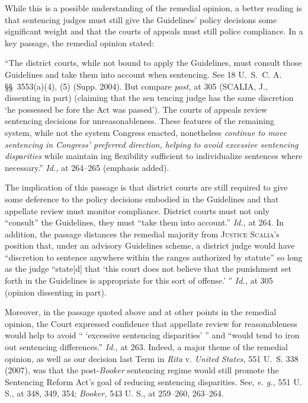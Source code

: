   While this is a possible understanding of the remedial opinion,
a better reading is that sentencing judges must still give the
Guidelines' policy decisions some significant weight and that the
courts of appeals must still police compliance. In a key passage, the
remedial opinion stated:

    ``The district courts, while not bound to apply the Guidelines,
    must consult those Guidelines and take them into account when
    sentencing. See 18 U.~S.~C. A. \S\S~3553(a)(4), (5) (Supp.
    2004). But compare \emph{post,} at 305 (SCALIA, J., dissenting in
    part) (claiming that the sen tencing judge has the same discretion
    ‘he possessed be fore the Act was passed'). The courts of
    appeals review sentencing decisions for unreasonableness. These
    fea\newpage tures of the remaining system, while not the system
    Congress enacted, nonetheless \emph{continue to move sentencing in
    Congress' preferred direction, helping to avoid excessive
    sentencing disparities} while maintain ing flexibility sufficient
    to individualize sentences where necessary.'' \emph{Id.,} at
    264--265 (emphasis added).

  The implication of this passage is that district courts are still
required to give some deference to the policy decisions embodied in the
Guidelines and that appellate review must monitor compliance. District
courts must not only ``consult'' the Guidelines, they must ``take
them into account.'' \emph{Id.,} at 264. In addition, the passage
distances the remedial majority from \textsc{Justice Scalia}'s position
that, under an advisory Guidelines scheme, a district judge would have
``discretion to sentence anywhere within the ranges authorized by
statute'' so long as the judge ``state[d] that ‘this court does not
believe that the punishment set forth in the Guidelines is appropriate
for this sort of offense.' '' \emph{Id.,} at 305 (opinion dissenting
in part).

  Moreover, in the passage quoted above and at other points in the
remedial opinion, the Court expressed confidence that appellate
review for reasonableness would help to avoid `` ‘excessive
sentencing disparities' '' and ``would tend to iron out sentencing
differences.'' \emph{Id.,} at 263. Indeed, a major theme of the
remedial opinion, as well as our decision last Term in \emph{Rita} v.
\emph{United States,} 551 U.~S. 338 (2007), was that the post-\emph{Booker}
sentencing regime would still promote the Sentencing Reform Act's goal
of reducing sentencing disparities. See, \emph{e. g.,} 551 U. S., at 348,
349, 354; \emph{Booker,} 543 U. S., at 259--260, 263--264.

